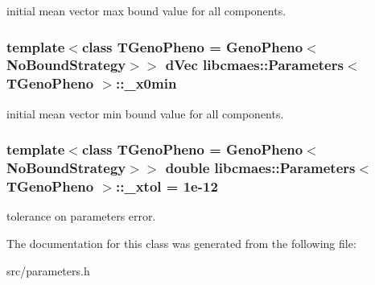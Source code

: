 initial mean vector max bound value for all components. \hypertarget{classlibcmaes_1_1Parameters_aa3bb27467698d9cb7fc7e0a83b48800f}{
\subsubsection[{\-\_\-x0min}]{\setlength{\rightskip}{0pt plus 5cm}template$<$class T\-Geno\-Pheno = Geno\-Pheno$<$\-No\-Bound\-Strategy$>$$>$ d\-Vec {\bf libcmaes\-::\-Parameters}$<$ T\-Geno\-Pheno $>$\-::\-\_\-x0min}}\label{classlibcmaes_1_1Parameters_aa3bb27467698d9cb7fc7e0a83b48800f}
initial mean vector min bound value for all components. \hypertarget{classlibcmaes_1_1Parameters_aaa9e8eedba7d7140d116163b40f653f8}{
\subsubsection[{\-\_\-xtol}]{\setlength{\rightskip}{0pt plus 5cm}template$<$class T\-Geno\-Pheno = Geno\-Pheno$<$\-No\-Bound\-Strategy$>$$>$ double {\bf libcmaes\-::\-Parameters}$<$ T\-Geno\-Pheno $>$\-::\-\_\-xtol = 1e-\/12}}\label{classlibcmaes_1_1Parameters_aaa9e8eedba7d7140d116163b40f653f8}
tolerance on parameters error. 

The documentation for this class was generated from the following file\-:\begin{DoxyCompactItemize}
\item 
src/parameters.\-h\end{DoxyCompactItemize}
